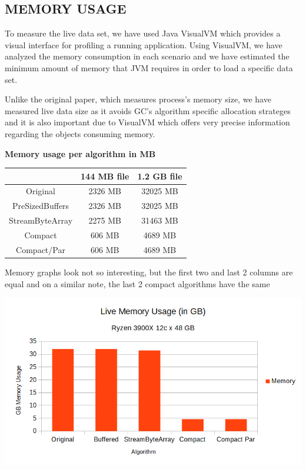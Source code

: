 \documentclass[a4paper,twoside]{article}
\begin{document}
\subsection{\uppercase{Memory Usage}}
\label{subsec:memusage}
To measure the live data set, we have used Java VisualVM \cite{visualvm:oracle} which provides a visual interface for profiling a running application. Using VisualVM, we have analyzed the memory consumption in each scenario and we have estimated the minimum amount of memory that JVM requires in order to load a specific data set.

Unlike the original paper, which measures process's memory size, we have measured live data size as it avoids GC's algorithm specific allocation strateges and it is also important due to VisualVM which offers very precise information regarding the objects consuming memory.


\begin{small}
\begin{center}
\textbf{Memory usage per algorithm in MB} \\
	\begin{tabular}{|c|c|c|}
		\hline			  	& 144 MB file		& 1.2 GB file		\\ \hline
		Original			& 2326 MB			& 32025 MB			\\ \hline
		PreSizedBuffers		& 2326 MB			& 32025 MB			\\ \hline
		StreamByteArray 	& 2275 MB			& 31463 MB			\\ \hline
		Compact 			& 606 MB			& 4689 MB			\\ \hline
		Compact/Par			& 606 MB			& 4689 MB			\\ \hline
	\end{tabular}
\end{center}
\end{small}

Memory graphs look not so interesting, but the first two and last 2 columns are equal and on a similar note, the last 2 compact algorithms have the same 

\begin{center}
	\includegraphics[scale=0.5]{images/memory_usage_1_2G.png}
\end{center}
\end{document}

